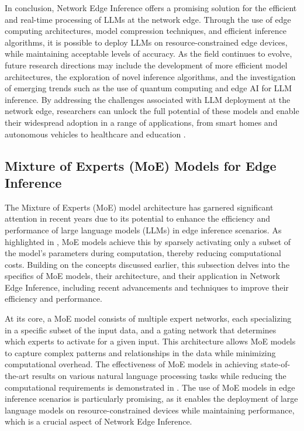 \documentclass[11pt,a4paper]{article}
\begin{document}
In conclusion, Network Edge Inference offers a promising solution for the efficient and real-time processing of LLMs at the network edge. Through the use of edge computing architectures, model compression techniques, and efficient inference algorithms, it is possible to deploy LLMs on resource-constrained edge devices, while maintaining acceptable levels of accuracy. As the field continues to evolve, future research directions may include the development of more efficient model architectures, the exploration of novel inference algorithms, and the investigation of emerging trends such as the use of quantum computing \cite{arxiv:2402.15627} and edge AI \cite{doi:10.1109/mnet.2025.3539338} for LLM inference. By addressing the challenges associated with LLM deployment at the network edge, researchers can unlock the full potential of these models and enable their widespread adoption in a range of applications, from smart homes and autonomous vehicles to healthcare and education \cite{arxiv:2402.06196}.


\subsection{Mixture of Experts (MoE) Models for Edge Inference}


The Mixture of Experts (MoE) model architecture has garnered significant attention in recent years due to its potential to enhance the efficiency and performance of large language models (LLMs) in edge inference scenarios. As highlighted in \cite{arxiv:1701.06538}, MoE models achieve this by sparsely activating only a subset of the model's parameters during computation, thereby reducing computational costs. Building on the concepts discussed earlier, this subsection delves into the specifics of MoE models, their architecture, and their application in Network Edge Inference, including recent advancements and techniques to improve their efficiency and performance.

At its core, a MoE model consists of multiple expert networks, each specializing in a specific subset of the input data, and a gating network that determines which experts to activate for a given input. This architecture allows MoE models to capture complex patterns and relationships in the data while minimizing computational overhead. The effectiveness of MoE models in achieving state-of-the-art results on various natural language processing tasks while reducing the computational requirements is demonstrated in \cite{doi:10.18653/v1/2022.emnlp-main.804}. The use of MoE models in edge inference scenarios is particularly promising, as it enables the deployment of large language models on resource-constrained devices while maintaining performance, which is a crucial aspect of Network Edge Inference.
\end{document}
